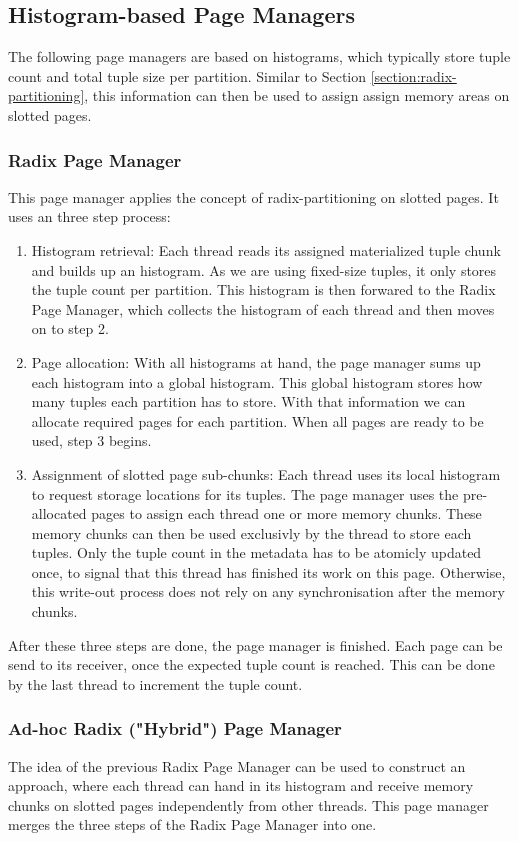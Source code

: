 \subsection{Histogram-based Page Managers}
The following page managers are based on histograms, which typically store tuple count and total tuple size per partition.
Similar to Section \ref{section:radix-partitioning}, this information can then be used to assign assign memory areas on slotted pages.
\subsubsection{Radix Page Manager}
This page manager applies the concept of radix-partitioning on slotted pages.
It uses an three step process:
\begin{enumerate}
  \item Histogram retrieval: Each thread reads its assigned materialized tuple chunk and builds up an histogram.
        As we are using fixed-size tuples, it only stores the tuple count per partition.
        This histogram is then forwared to the Radix Page Manager, which collects the histogram of each thread and then moves on to step 2.

  \item Page allocation: With all histograms at hand, the page manager sums up each histogram into a global histogram.
        This global histogram stores how many tuples each partition has to store.
        With that information we can allocate required pages for each partition.
        When all pages are ready to be used, step 3 begins.

  \item Assignment of slotted page sub-chunks: Each thread uses its local histogram to request storage locations for its tuples.
        The page manager uses the pre-allocated pages to assign each thread one or more memory chunks.
        These memory chunks can then be used exclusivly by the thread to store each tuples.
        Only the tuple count in the metadata has to be atomicly updated once, to signal that this thread has finished its work on this page.
        Otherwise, this write-out process does not rely on any synchronisation after the memory chunks.
\end{enumerate}
After these three steps are done, the page manager is finished.
Each page can be send to its receiver, once the expected tuple count is reached.
This can be done by the last thread to increment the tuple count.

\subsubsection{Ad-hoc Radix ("Hybrid") Page Manager}
The idea of the previous Radix Page Manager can be used to construct an approach, where each thread can hand in its histogram and receive memory chunks on slotted pages independently from other threads.
This page manager merges the three steps of the Radix Page Manager into one.

